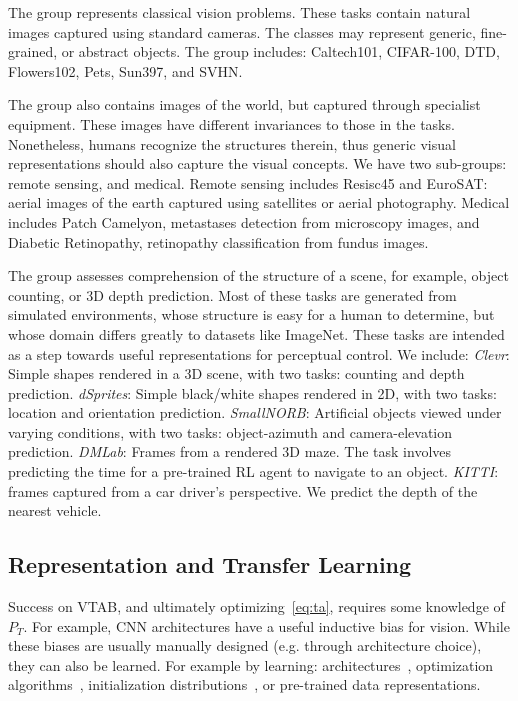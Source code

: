 The \taskNatural{} group represents classical vision problems. These tasks contain natural images captured using standard cameras. The classes may represent generic, fine-grained, or abstract objects. The group includes: Caltech101, CIFAR-100, DTD, Flowers102, Pets, Sun397, and SVHN.

The \taskSpecialized{} group also contains images of the world, but captured through specialist equipment. These images have different invariances to those in the \taskNatural{} tasks. Nonetheless, humans recognize the structures therein, thus generic visual representations should also capture the visual concepts. We have two sub-groups: remote sensing, and medical. Remote sensing includes Resisc45 and EuroSAT: aerial images of the earth captured using satellites or aerial photography. Medical includes Patch Camelyon, metastases detection from microscopy images, and Diabetic Retinopathy, retinopathy classification from fundus images.

The \taskStructured{} group assesses comprehension of the structure of a scene, for example, object counting, or 3D depth prediction. Most of these tasks are generated from simulated environments, whose structure is easy for a human to determine, but whose domain differs greatly to datasets like ImageNet. These tasks are intended as a step towards useful representations for perceptual control. We include:
\emph{Clevr}: Simple shapes rendered in a 3D scene, with two tasks: counting and depth prediction.
\emph{dSprites}: Simple black/white shapes rendered in 2D, with two tasks: location and orientation prediction.
\emph{SmallNORB}: Artificial objects viewed under varying conditions, with two tasks: object-azimuth and camera-elevation prediction.
\emph{DMLab}: Frames from a rendered 3D maze. The task involves predicting the time for a pre-trained RL agent to navigate to an object.
\emph{KITTI}: frames captured from a car driver's perspective. We predict the depth of the nearest vehicle.

\subsection{Representation and Transfer Learning}

Success on VTAB, and ultimately optimizing~\ref{eq:ta}, requires some knowledge of $P_{T}$. For example, CNN architectures have a useful inductive bias for vision. While these biases are usually manually designed (e.g. through architecture choice), they can also be learned. For example by learning: architectures~\citet{zoph2017}, optimization algorithms~\citet{bello2017neural}, initialization distributions~\citet{raghu2019},
or pre-trained data representations.

